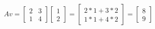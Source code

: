 \documentclass[preview]{standalone}
\begin{document}
\begin{align*}
Av = \begin{bmatrix} 2 & 3 \\ 1 & 4 \end{bmatrix} \begin{bmatrix} 1 \\ 2 \end{bmatrix} = \begin{bmatrix} 2*1+3*2 \\ 1*1+4*2 \end{bmatrix} = \begin{bmatrix} 8 \\ 9 \end{bmatrix}
\end{align*}
\end{document}
